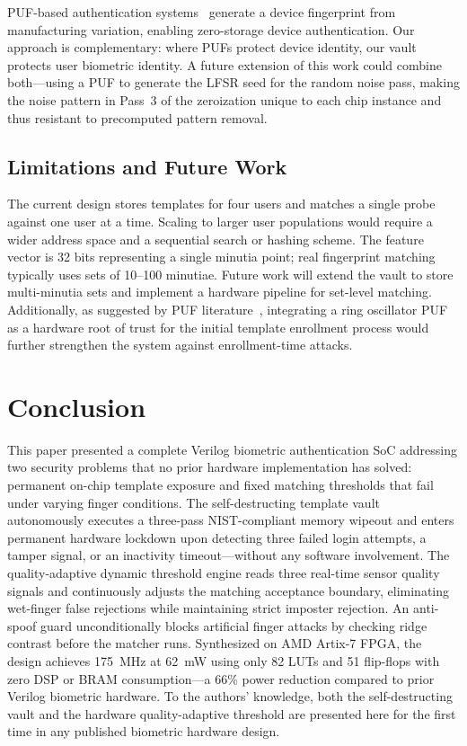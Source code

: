 \documentclass[conference]{IEEEtran}
\begin{document}
PUF-based authentication systems~\cite{puf_auth} generate a device
fingerprint from manufacturing variation, enabling zero-storage
device authentication. Our approach is complementary: where PUFs
protect device identity, our vault protects user biometric identity.
A future extension of this work could combine both---using a PUF to
generate the LFSR seed for the random noise pass, making the noise
pattern in Pass~3 of the zeroization unique to each chip instance and
thus resistant to precomputed pattern removal.

\subsection{Limitations and Future Work}

The current design stores templates for four users and matches a
single probe against one user at a time. Scaling to larger user
populations would require a wider address space and a sequential
search or hashing scheme. The feature vector is 32 bits representing
a single minutia point; real fingerprint matching typically uses
sets of 10--100 minutiae. Future work will extend the vault to store
multi-minutia sets and implement a hardware pipeline for set-level
matching. Additionally, as suggested by PUF literature~\cite{puf_auth},
integrating a ring oscillator PUF as a hardware root of trust for the
initial template enrollment process would further strengthen the
system against enrollment-time attacks.

\section{Conclusion}

This paper presented a complete Verilog biometric authentication SoC
addressing two security problems that no prior hardware implementation
has solved: permanent on-chip template exposure and fixed matching
thresholds that fail under varying finger conditions. The
self-destructing template vault autonomously executes a three-pass
NIST-compliant memory wipeout and enters permanent hardware lockdown
upon detecting three failed login attempts, a tamper signal, or an
inactivity timeout---without any software involvement. The quality-adaptive
dynamic threshold engine reads three real-time sensor quality signals
and continuously adjusts the matching acceptance boundary, eliminating
wet-finger false rejections while maintaining strict imposter rejection.
An anti-spoof guard unconditionally blocks artificial finger attacks
by checking ridge contrast before the matcher runs. Synthesized on
AMD Artix-7 FPGA, the design achieves 175~MHz at 62~mW using only
82 LUTs and 51 flip-flops with zero DSP or BRAM consumption---a 66\%
power reduction compared to prior Verilog biometric hardware. To the
authors' knowledge, both the self-destructing vault and the
hardware quality-adaptive threshold are presented here for the first
time in any published biometric hardware design.
\end{document}
